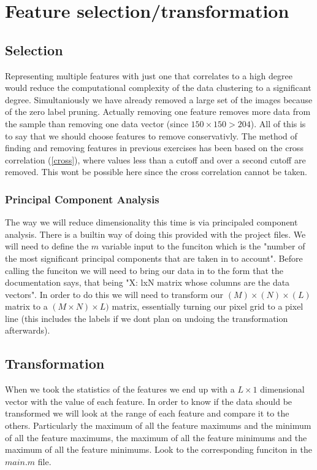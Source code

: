 \documentclass[12pt, a4paper]{article}
\begin{document}
\section{Feature selection/transformation}

\subsection{Selection}

Representing multiple features with just one that correlates to a high degree would reduce the computational complexity of the data clustering to a significant degree. Simultaniously we have already removed a large set of the images because of the zero label pruning. Actually removing one feature removes more data from the sample than removing one data vector (since $150\times150>204$). All of this is to say that we should choose features to remove conservativly. The method of finding and removing features in previous exercises has been based on the cross correlation (\ref{cross}), where values less than a cutoff and over a second cutoff are removed. This wont be possible here since the cross correlation cannot be taken.
\newline

\subsubsection{Principal Component Analysis}

The way we will reduce dimensionality this time is via principaled component analysis. There is a builtin way of doing this provided with the project files. We will need to define the $m$ variable input to the funciton which is the "number of the most significant principal components that are taken in to account". Before calling the funciton we will need to bring our data in to the form that the documentation says, that being "X: lxN matrix whose columns are the data vectors". In order to do this we will need to transform our $(M)\times (N)\times (L)$ matrix to a $(M\times N) \times L)$ matrix, essentially turning our pixel grid to a pixel line (this includes the labels if we dont plan on undoing the transformation afterwards).
\newline

\subsection{Transformation}

When we took the statistics of the features we end up with a $L\times1$ dimensional vector with the value of each feature. In order to know if the data should be transformed we will look at the range of each feature and compare it to the others. Particularly the maximum of all the feature maximums and the minimum of all the feature maximums, the maximum of all the feature minimums and the maximum of all the feature minimums. Look to the corresponding funciton in the $main.m$ file.
\newline
\end{document}
